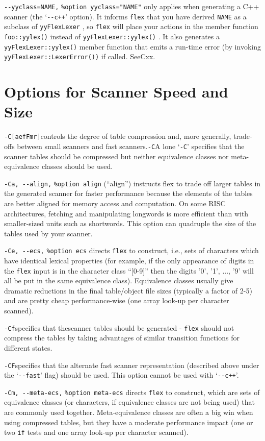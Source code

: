 \documentclass[openany,oneside]{book}
\begin{document}
\verb`--yyclass=NAME,` \verb`%option yyclass="NAME"` only applies when generating a C++ scanner (the ‘\verb`--c++`’ option).  It
informs \verb`flex` that you have derived \verb`NAME` as a subclass of \verb`yyFlexLexer` , so \verb`flex` will place your actions in the member
function \verb`foo::yylex()` instead of \verb`yyFlexLexer::yylex()` .  It
also generates a \verb`yyFlexLexer::yylex()` member function that emits
a run-time error (by invoking \verb`yyFlexLexer::LexerError())` if
called.  SeeCxx.
\section{Options for Scanner Speed and Size}
\verb`-C[aefFmr]`controls the degree of table compression and, more generally, trade-offs
between small scanners and fast scanners.\verb`-C`A lone ‘\verb`-C`’ specifies that the scanner tables should be compressed
but neither equivalence classes nor meta-equivalence classes should be
used.

\verb`-Ca, --align,` \verb`%option align` (“align”) instructs flex to trade off larger tables in the
generated scanner for faster performance because the elements of
the tables are better aligned for memory access and computation.  On some
RISC architectures, fetching and manipulating longwords is more efficient
than with smaller-sized units such as shortwords.  This option can
quadruple the size of the tables used by your scanner.

\verb`-Ce, --ecs,` \verb`%option ecs` directs \verb`flex` to construct, i.e., sets
of characters which have identical lexical properties (for example, if
the only appearance of digits in the \verb`flex` input is in the
character class “[0-9]” then the digits '0', '1', ..., '9' will all be
put in the same equivalence class).  Equivalence classes usually give
dramatic reductions in the final table/object file sizes (typically a
factor of 2-5) and are pretty cheap performance-wise (one array look-up
per character scanned).

\verb`-Cf`specifies that thescanner tables should be generated - \verb`flex` should not compress the tables by taking advantages of
similar transition functions for different states.

\verb`-CF`specifies that the alternate fast scanner representation (described
above under the ‘\verb`--fast`’ flag) should be used.  This option cannot be
used with ‘\verb`--c++`’.

\verb`-Cm, --meta-ecs,` \verb`%option meta-ecs` directs \verb`flex` to construct,
which are sets of equivalence classes (or characters, if equivalence
classes are not being used) that are commonly used together.  Meta-equivalence
classes are often a big win when using compressed tables, but they
have a moderate performance impact (one or two \verb`if` tests and one
array look-up per character scanned).
\end{document}
